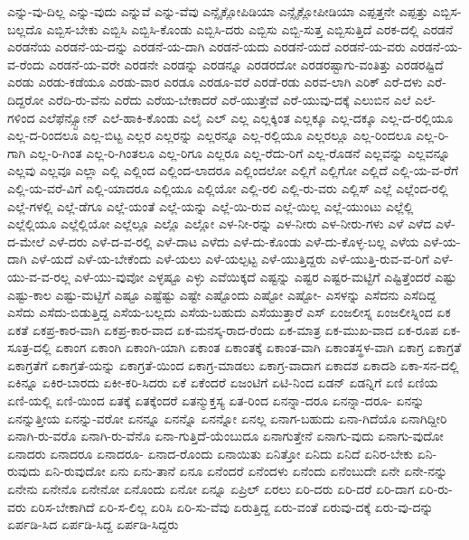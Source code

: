 {ಎನ್ನು-ವು-ದಿಲ್ಲ
ಎನ್ನು-ವುದು
ಎನ್ನುವೆ
ಎನ್ನು-ವೆವು
ಎನ್ಸೈಕ್ಲೋಪಿಡಿಯಾ
ಎನ್ಸೈಕ್ಲೋಪೀಡಿಯಾ
ಎಪ್ಪತ್ತನೇ
ಎಪ್ಪತ್ತು
ಎಬ್ಬಿಸ-ಬಲ್ಲದೊ
ಎಬ್ಬಿಸ-ಬೇಕು
ಎಬ್ಬಿಸಿ
ಎಬ್ಬಿಸಿ-ಕೊಂಡು
ಎಬ್ಬಿಸಿ-ದರು
ಎಬ್ಬಿಸು
ಎಬ್ಬಿ-ಸುತ್ತ
ಎಬ್ಬಿಸುತ್ತಿದೆ
ಎರಕ-ದಲ್ಲಿ
ಎರಡನೆ
ಎರಡನೆಯ
ಎರಡನೆ-ಯ-ದನ್ನು
ಎರಡನೆ-ಯ-ದಾಗಿ
ಎರಡನೆ-ಯದು
ಎರಡನೆ-ಯದೆ
ಎರಡನೆ-ಯ-ವರು
ಎರಡನೆ-ಯ-ವ-ರೆಂದು
ಎರಡನೆ-ಯ-ವರೇ
ಎರಡನೇ
ಎರಡನ್ನು
ಎರಡನ್ನೂ
ಎರಡರದೋ
ಎರಡರಷ್ಟಾಗು-ವಂತಿತ್ತು
ಎರಡರಷ್ಟಿದೆ
ಎರಡು
ಎರಡು-ಕಡೆಯೂ
ಎರಡು-ವಾರ
ಎರಡೂ
ಎರಡೂ-ವರೆ
ಎರಡೆ-ರಡು
ಎರವ-ಲಾಗಿ
ಎರಿಕ್
ಎರೆ-ದಳು
ಎರೆ-ದಿದ್ದರೋ
ಎರೆದಿ-ರು-ವೆನು
ಎರೆದು
ಎರೆಯ-ಬೇಕಾದರೆ
ಎರೆ-ಯುತ್ತೇವೆ
ಎರೆ-ಯುವು-ದಕ್ಕೆ
ಎಲುಬಿನ
ಎಲೆ
ಎಲೆ-ಗಳಿಂದ
ಎಲೆಫೆನ್ಸ್ಟೋನ್
ಎಲೆ-ಹಾಕಿ-ಕೊಂಡು
ಎಲೈ
ಎಲ್
ಎಲ್ಲ
ಎಲ್ಲಕ್ಕಿಂತ
ಎಲ್ಲಕ್ಕೂ
ಎಲ್ಲ-ದಕ್ಕೂ
ಎಲ್ಲ-ದ-ರಲ್ಲಿಯೂ
ಎಲ್ಲ-ದ-ರಿಂದಲೂ
ಎಲ್ಲ-ಬಿಟ್ಟ
ಎಲ್ಲರ
ಎಲ್ಲರನ್ನು
ಎಲ್ಲರನ್ನೂ
ಎಲ್ಲ-ರಲ್ಲಿಯೂ
ಎಲ್ಲರಲ್ಲೂ
ಎಲ್ಲ-ರಿಂದಲೂ
ಎಲ್ಲ-ರಿ-ಗಾಗಿ
ಎಲ್ಲ-ರಿ-ಗಿಂತ
ಎಲ್ಲ-ರಿ-ಗಿಂತಲೂ
ಎಲ್ಲ-ರಿಗೂ
ಎಲ್ಲರೂ
ಎಲ್ಲ-ರೆದು-ರಿಗೆ
ಎಲ್ಲ-ರೊಡನೆ
ಎಲ್ಲವನ್ನು
ಎಲ್ಲವನ್ನೂ
ಎಲ್ಲವು
ಎಲ್ಲವೂ
ಎಲ್ಲಾ
ಎಲ್ಲಿ
ಎಲ್ಲಿಂದ
ಎಲ್ಲಿಂದ-ಲಾದರೂ
ಎಲ್ಲಿಂದಲೋ
ಎಲ್ಲಿಗೆ
ಎಲ್ಲಿಗೋ
ಎಲ್ಲಿದೆ
ಎಲ್ಲಿ-ಯ-ವ-ರೆಗೆ
ಎಲ್ಲಿ-ಯ-ವರೆ-ವಿಗೆ
ಎಲ್ಲಿ-ಯಾದರೂ
ಎಲ್ಲಿಯೂ
ಎಲ್ಲಿಯೋ
ಎಲ್ಲಿ-ರಲಿ
ಎಲ್ಲಿ-ರು-ವರು
ಎಲ್ಲಿಸ್
ಎಲ್ಲೆ
ಎಲ್ಲೆಂದ-ರಲ್ಲಿ
ಎಲ್ಲೆ-ಗಳಲ್ಲಿ
ಎಲ್ಲೆ-ಡೆಗೂ
ಎಲ್ಲೆ-ಯಂತೆ
ಎಲ್ಲೆ-ಯನ್ನು
ಎಲ್ಲೆ-ಯಿ-ರುವ
ಎಲ್ಲೆ-ಯಿಲ್ಲ
ಎಲ್ಲೆ-ಯುಂಟು
ಎಲ್ಲೆಲ್ಲಿ
ಎಲ್ಲೆಲ್ಲಿಯೂ
ಎಲ್ಲೆಲ್ಲಿಯೋ
ಎಲ್ಲೆಲ್ಲೂ
ಎಲ್ಲೊ
ಎಲ್ಲೋ
ಎಳ-ನೀ-ರನ್ನು
ಎಳ-ನೀರು
ಎಳ-ನೀರು-ಗಳು
ಎಳೆ
ಎಳೆದ
ಎಳೆ-ದ-ಮೇಲೆ
ಎಳೆ-ದರು
ಎಳೆ-ದ-ವ-ರಲ್ಲಿ
ಎಳೆ-ದಾಟ
ಎಳೆದು
ಎಳೆ-ದು-ಕೊಂಡು
ಎಳೆ-ದು-ಕೊಳ್ಳ-ಬಲ್ಲ
ಎಳೆಯ
ಎಳೆ-ಯ-ದಾಗಿ
ಎಳೆ-ಯದೆ
ಎಳೆ-ಯ-ಬೇಕೆಂದು
ಎಳೆ-ಯಲು
ಎಳೆ-ಯಲ್ಪಟ್ಟ
ಎಳೆ-ಯುತ್ತಿದ್ದರು
ಎಳೆ-ಯುತ್ತಿ-ರುವ-ವ-ರಿಗೆ
ಎಳೆ-ಯು-ವ-ವ-ರಲ್ಲ
ಎಳೆ-ಯು-ವುವೋ
ಎಳ್ಳಷ್ಟೂ
ಎಳ್ಳು
ಎವೆಯಿಕ್ಕದೆ
ಎಷ್ಟನ್ನು
ಎಷ್ಟರ
ಎಷ್ಟರ-ಮಟ್ಟಿಗೆ
ಎಷ್ಟಿತ್ತೆಂದರೆ
ಎಷ್ಟು
ಎಷ್ಟು-ಕಾಲ
ಎಷ್ಟು-ಮಟ್ಟಿಗೆ
ಎಷ್ಟೂ
ಎಷ್ಟೆಷ್ಟು
ಎಷ್ಟೇ
ಎಷ್ಟೊಂದು
ಎಷ್ಟೋ
ಎಷ್ಟೋ-
ಎಸಳನ್ನು
ಎಸೆದನು
ಎಸೆದಿದ್ದ
ಎಸೆದು
ಎಸೆದು-ಬಿಡುತ್ತಿದ್ದ
ಎಸೆಯ-ಬಲ್ಲದು
ಎಸೆಯ-ಬಹುದು
ಎಸೆಯುತ್ತಾರೆ
ಎಸ್
ಏಂಜಲೀಸ್ನ
ಏಂಜಲೀಸ್ನಿಂದ
ಏಕ
ಏಕತೆ
ಏಕಪ್ರ-ಕಾರ-ವಾಗಿ
ಏಕಪ್ರ-ಕಾರ-ವಾದ
ಏಕ-ಮನಸ್ಕ-ರಾದ-ರೆಂದು
ಏಕ-ಮಾತ್ರ
ಏಕ-ಮುಖ-ವಾದ
ಏಕ-ರೂಪ
ಏಕ-ಸೂತ್ರ-ದಲ್ಲಿ
ಏಕಾಂಗ
ಏಕಾಂಗಿ
ಏಕಾಂಗಿ-ಯಾಗಿ
ಏಕಾಂತ
ಏಕಾಂತಕ್ಕೆ
ಏಕಾಂತ-ವಾಗಿ
ಏಕಾಂತಸ್ಥಳ-ವಾಗಿ
ಏಕಾಗ್ರ
ಏಕಾಗ್ರತೆ
ಏಕಾಗ್ರತೆಗೆ
ಏಕಾಗ್ರತೆ-ಯನ್ನು
ಏಕಾಗ್ರತೆ-ಯಿಂದ
ಏಕಾಗ್ರ-ಮಾಡಲು
ಏಕಾಗ್ರ-ವಾದಾಗ
ಏಕಾದಶ
ಏಕಾದಶಿ
ಏಕಾ-ಸನ-ದಲ್ಲಿ
ಏಕಿನ್ನೂ
ಏಕಿರ-ಬಾರದು
ಏಕೀ-ಕರಿ-ಸಿದರು
ಏಕೆ
ಏಕೆಂದರೆ
ಏಜಂಟಿಗೆ
ಏಟಿ-ನಿಂದ
ಏಡನ್
ಏಡನ್ನಿಗೆ
ಏಣಿ
ಏಣಿಯ
ಏಣಿ-ಯಲ್ಲಿ
ಏಣಿ-ಯಿಂದ
ಏತಕ್ಕೆ
ಏತಕ್ಕೆಂದರೆ
ಏತನ್ಮುಕ್ತಸ್ಯ
ಏತ-ರಿಂದ
ಏನನ್ನಾ-ದರೂ
ಏನನ್ನಾ-ದರೂ-
ಏನನ್ನು
ಏನನ್ನುತ್ತೀಯ
ಏನನ್ನು-ವರೋ
ಏನನ್ನೂ
ಏನನ್ನೊ
ಏನನ್ನೋ
ಏನಲ್ಲ
ಏನಾಗ-ಬಹುದು
ಏನಾ-ಗಿದೆಯೊ
ಏನಾಗಿದ್ದೀರಿ
ಏನಾಗಿ-ರು-ವರೊ
ಏನಾಗಿ-ರು-ವೆನೊ
ಏನಾ-ಗುತ್ತಿದೆ-ಯೆಂಬುದೂ
ಏನಾಗುತ್ತೇನೆ
ಏನಾಗು-ವುದು
ಏನಾಗು-ವುದೋ
ಏನಾದರು
ಏನಾದರೂ
ಏನಾದರೂ-
ಏನಾದ-ರೊಂದು
ಏನಾಯಿತು
ಏನಿತ್ತೋ
ಏನಿದು
ಏನಿದೆ
ಏನಿರ-ಬೇಕು
ಏನಿ-ರುವುದು
ಏನಿ-ರುವುದೋ
ಏನು
ಏನು-ತಾನೆ
ಏನೂ
ಏನೆಂದರೆ
ಏನೆಂದಳು
ಏನೆಂದು
ಏನೆಂಬುದೇ
ಏನೇ
ಏನೇ-ನನ್ನು
ಏನೇನು
ಏನೇನೊ
ಏನೇನೋ
ಏನೊಂದು
ಏನೋ
ಏನ್ನೂ
ಏಪ್ರಿಲ್
ಏರಲು
ಏರಿ-ದರು
ಏರಿ-ದರೆ
ಏರಿ-ದಾಗ
ಏರಿ-ರು-ವರು
ಏರಿಸ-ಬೇಕಾಗಿದೆ
ಏರಿ-ಸ-ಲಿಲ್ಲ
ಏರಿಸಿ
ಏರಿ-ಸು-ವೆವು
ಏರುತ್ತಿದ್ದ
ಏರು-ವಂತೆ
ಏರುವು-ದಕ್ಕೆ
ಏರು-ವು-ದನ್ನು
ಏರ್ಪಡಿ-ಸಿದ
ಏರ್ಪಡಿ-ಸಿದ್ದ
ಏರ್ಪಡಿ-ಸಿದ್ದರು
}
